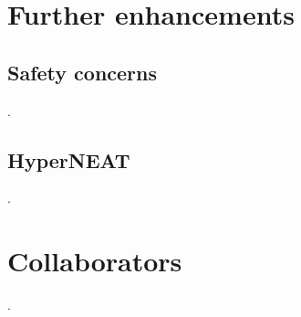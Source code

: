 \documentclass[11pt]{article}
\begin{document}
	\section{Further enhancements}
		\subsection{Safety concerns}
			.
		\subsection{HyperNEAT}
			.
	\newline

	\section{Collaborators}
		.
	\newline

	\nocite{*}
	{\RaggedRight
		
		
	}
\end{document}
